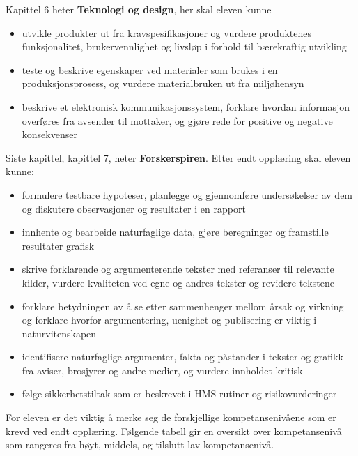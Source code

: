 \documentclass[main.tex]{subfiles}
\begin{document}
Kapittel 6 heter \textbf{Teknologi og design}, her skal eleven kunne 
\begin{itemize}[noitemsep]
\item utvikle produkter ut fra kravspesifikasjoner og vurdere produktenes funksjonalitet, brukervennlighet og livsløp i forhold til bærekraftig utvikling
\item teste og beskrive egenskaper ved materialer som brukes i en produksjonsprosess, og vurdere materialbruken ut fra miljøhensyn
\item beskrive et elektronisk kommunikasjonssystem, forklare hvordan informasjon overføres fra avsender til mottaker, og gjøre rede for positive og negative konsekvenser
\end{itemize}
Siste kapittel, kapittel 7, heter \textbf{Forskerspiren}. Etter endt opplæring skal eleven kunne:
\begin{itemize}[noitemsep]
\item formulere testbare hypoteser, planlegge og gjennomføre undersøkelser av dem og diskutere observasjoner og resultater i en rapport
\item innhente og bearbeide naturfaglige data, gjøre beregninger og framstille resultater grafisk
\item skrive forklarende og argumenterende tekster med referanser til relevante kilder, vurdere kvaliteten ved egne og andres tekster og revidere tekstene
\item forklare betydningen av å se etter sammenhenger mellom årsak og virkning og forklare hvorfor argumentering, uenighet og publisering er viktig i naturvitenskapen
\item identifisere naturfaglige argumenter, fakta og påstander i tekster og grafikk fra aviser, brosjyrer og andre medier, og vurdere innholdet kritisk
\item følge sikkerhetstiltak som er beskrevet i HMS-rutiner og risikovurderinger
\end{itemize}
For eleven er det viktig å merke seg de forskjellige kompetansenivåene som er krevd ved endt opplæring. Følgende tabell gir en oversikt over kompetansenivå som rangeres fra høyt, middels, og tilslutt lav kompetansenivå.
\end{document}
